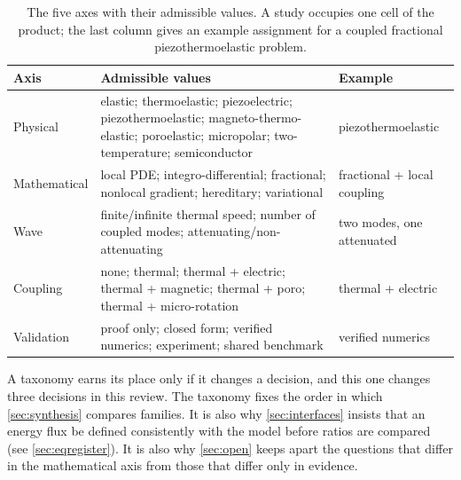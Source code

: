 \begin{table}[H]\centering\small
\caption{The five axes with their admissible values. A study occupies one cell of the product; the last
column gives an example assignment for a coupled fractional piezothermoelastic problem.}
\label{tab:taxonomy-axes}
\begin{tabularx}{\textwidth}{@{}p{2.1cm}Y Y@{}}
\toprule
\textbf{Axis} & \textbf{Admissible values} & \textbf{Example} \\
\midrule
Physical & elastic; thermoelastic; piezoelectric; piezothermoelastic; magneto-thermo-elastic; poroelastic;
  micropolar; two-temperature; semiconductor & piezothermoelastic \\
Mathematical & local PDE; integro-differential; fractional; nonlocal gradient; hereditary; variational &
  fractional + local coupling \\
Wave & finite/infinite thermal speed; number of coupled modes; attenuating/non-attenuating &
  two modes, one attenuated \\
Coupling & none; thermal; thermal + electric; thermal + magnetic; thermal + poro; thermal + micro-rotation &
  thermal + electric \\
Validation & proof only; closed form; verified numerics; experiment; shared benchmark &
  verified numerics \\
\bottomrule
\end{tabularx}
\end{table}

A taxonomy earns its place only if it changes a decision, and this one changes three decisions in this review.
The taxonomy fixes the order in which \cref{sec:synthesis} compares families. It is also why \cref{sec:interfaces} insists that an energy flux be defined consistently with the model before ratios are compared (see \cref{sec:eqregister}). It is also why \cref{sec:open} keeps apart the questions that differ in the
mathematical axis from those that differ only in evidence.
